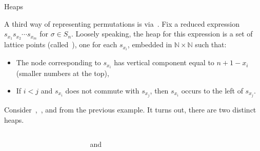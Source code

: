\documentclass[9pt]{beamer}
\begin{document}

\begin{frame}{Heaps}

A third way of representing permutations is via \,.  Fix a reduced expression $s_{x_1}s_{x_2}\cdots s_{x_m}$ for $\sigma\in S_{n}$.  Loosely speaking, the heap for this expression is a set of lattice points (called \,), one for each $s_{x_{i}}$, embedded in $\mathbb{N}\times \mathbb{N}$ such that:

\begin{itemize}
\item The node corresponding to $s_{x_{i}}$ has vertical component equal to $n+1-x_{i}$ (smaller numbers at the top), 
\item If $i<j$ and $s_{x_{i}}$ does not commute with $s_{x_{j}}$, then $s_{x_{i}}$ occurs to the left of $s_{x_{j}}$.
\end{itemize}

\begin{example}
Consider \,, \,, and  from the previous example.  It turns out, there are two distinct heaps.
\begin{columns}
\begin{column}{.4\linewidth}
\begin{center}
\end{center}
\end{column}

\begin{column}{.1\linewidth}
\begin{center}
and
\end{center}
\end{column}

\begin{column}{.4\linewidth}
\begin{center}
\end{center}
\end{column}
\end{columns}


\end{example}
\end{frame}
\end{document}
